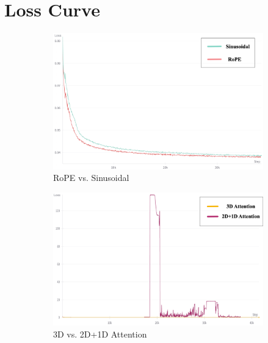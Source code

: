 \vspace{-1em}
\section{Loss Curve}

\begin{figure}[H]
    \centering
    \begin{subfigure}[b]{0.34\textwidth}
        \includegraphics[width=\textwidth]{images/ab_sr.png}
        \caption{RoPE vs. Sinusoidal}
        \label{fig:loss-rope-sin}
    \end{subfigure}
    \begin{subfigure}[b]{0.34\textwidth}
        \includegraphics[width=\textwidth]{images/ab_rl.png}
        \caption{3D vs. 2D+1D Attention}
        \label{fig:loss-attn}
    \end{subfigure}
    \begin{subfigure}[b]{0.34\textwidth}

\end{subfigure}
\end{figure}
